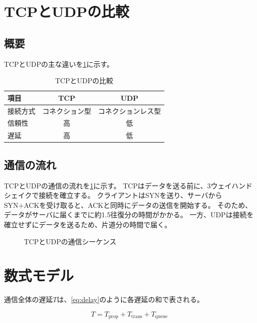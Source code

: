 
\section{TCPとUDPの比較}
\label{sec:compare}

\subsection{概要}
\label{sec:overview}

TCPとUDPの主な違いを\cref{tab:tcp-udp}に示す。

\begin{table}[htbp]
\centering
\caption{TCPとUDPの比較}
\label{tab:tcp-udp}
\begin{tabular}{lcc}
\toprule
項目 & TCP & UDP \\
\midrule
接続方式 & コネクション型 & コネクションレス型 \\
信頼性 & 高 & 低 \\
遅延 & 高 & 低 \\
\bottomrule
\end{tabular}
\end{table}

\subsection{通信の流れ}
\label{sec:flow}

TCPとUDPの通信の流れを\cref{fig:sequence}に示す。
TCPはデータを送る前に、3ウェイハンドシェイクで接続を確立する。
クライアントはSYNを送り、サーバからSYN+ACKを受け取ると、ACKと同時にデータの送信を開始する。
そのため、データがサーバに届くまでに約1.5往復分の時間がかかる。
一方、UDPは接続を確立せずにデータを送るため、片道分の時間で届く。

\begin{figure}[htbp]
\centering

\caption{TCPとUDPの通信シーケンス}
\label{fig:sequence}
\end{figure}

\section{数式モデル}
\label{sec:model}

通信全体の遅延$T$は、\cref{eq:delay}のように各遅延の和で表される。

\begin{equation}
  T = T_{\mathrm{prop}} + T_{\mathrm{trans}} + T_{\mathrm{queue}}
  \label{eq:delay}
\end{equation}

